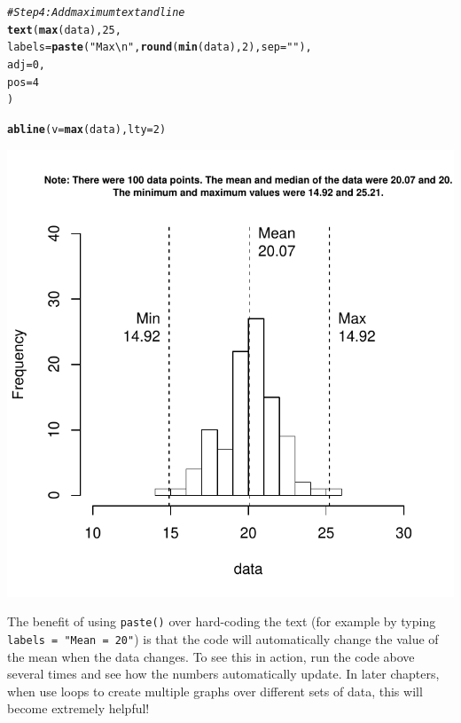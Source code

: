 \documentclass{tufte-book}\usepackage[]{graphicx}\usepackage[]{color}
\makeatletter
\def\maxwidth{ %
  \ifdim\Gin@nat@width>\linewidth
    \linewidth
  \else
    \Gin@nat@width
  \fi
}
\newcommand{\hlnum}[1]{\textcolor[rgb]{0.686,0.059,0.569}{#1}}%
\newcommand{\hlstr}[1]{\textcolor[rgb]{0.192,0.494,0.8}{#1}}%
\newcommand{\hlcom}[1]{\textcolor[rgb]{0.678,0.584,0.686}{\textit{#1}}}%
\newcommand{\hlstd}[1]{\textcolor[rgb]{0.345,0.345,0.345}{#1}}%
\newcommand{\hlkwc}[1]{\textcolor[rgb]{0.333,0.667,0.333}{#1}}%
\newcommand{\hlkwd}[1]{\textcolor[rgb]{0.737,0.353,0.396}{\textbf{#1}}}%
\newenvironment{kframe}{%
 \def\at@end@of@kframe{}%
 \ifinner\ifhmode%
  \def\at@end@of@kframe{\end{minipage}}%
  \begin{minipage}{\columnwidth}%
 \fi\fi%
 \def\FrameCommand##1{\hskip\@totalleftmargin \hskip-\fboxsep
 \colorbox{shadecolor}{##1}\hskip-\fboxsep
     \hskip-\linewidth \hskip-\@totalleftmargin \hskip\columnwidth}%
 \MakeFramed {\advance\hsize-\width
   \@totalleftmargin\z@ \linewidth\hsize
   \@setminipage}}%
 {\par\unskip\endMakeFramed%
 \at@end@of@kframe}
\newenvironment{knitrout}{}{} %
\makeatother
\begin{document}
\begin{footnotesize}
\begin{footnotesize}
\begin{knitrout}
\begin{kframe}
\begin{alltt}
\hlcom{# Step 4: Add maximum text and line}
\hlkwd{text}\hlstd{(}\hlkwd{max}\hlstd{(data),} \hlnum{25}\hlstd{,}
     \hlkwc{labels} \hlstd{=} \hlkwd{paste}\hlstd{(}\hlstr{"Max\textbackslash{}n"}\hlstd{,} \hlkwd{round}\hlstd{(}\hlkwd{min}\hlstd{(data),} \hlnum{2}\hlstd{),} \hlkwc{sep} \hlstd{=} \hlstr{""}\hlstd{),}
     \hlkwc{adj} \hlstd{=} \hlnum{0}\hlstd{,}
     \hlkwc{pos} \hlstd{=} \hlnum{4}
\hlstd{)}

\hlkwd{abline}\hlstd{(}\hlkwc{v} \hlstd{=} \hlkwd{max}\hlstd{(data),} \hlkwc{lty} \hlstd{=} \hlnum{2}\hlstd{)}
\end{alltt}
\end{kframe}
\includegraphics[width=\maxwidth]{figure/unnamed-chunk-170-1} 

\end{knitrout}
\end{footnotesize}

The benefit of using \texttt{paste()} over hard-coding the text (for example by typing \texttt{labels = "Mean = 20"}) is that the code will automatically change the value of the mean when the data changes. To see this in action, run the code above several times and see how the numbers automatically update. In later chapters, when use loops to create multiple graphs over different sets of data, this will become extremely helpful!



\end{footnotesize}
\end{document}
